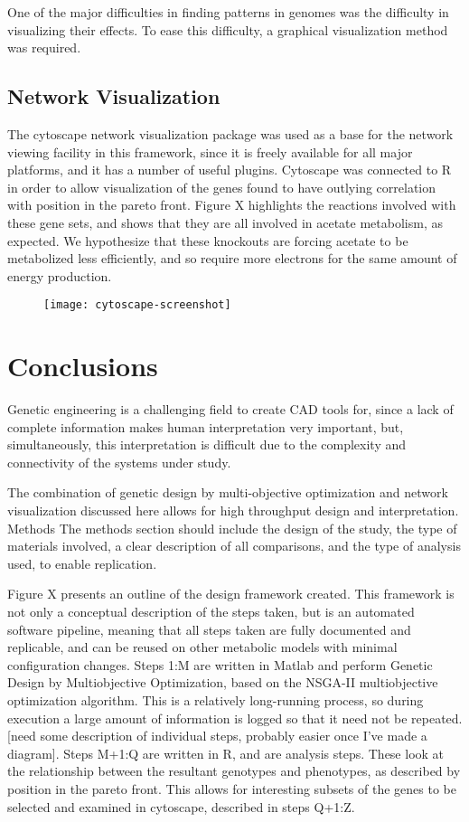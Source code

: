 \documentclass[a4paper]{article}
\begin{document}
One of the major difficulties in finding patterns in genomes was the difficulty in visualizing their effects. To ease this difficulty, a graphical visualization method was required.
\subsection{Network Visualization}
The cytoscape network visualization package was used as a base for the network viewing facility in this framework, since it is freely available for all major platforms, and it has a number of useful plugins. Cytoscape was connected to R in order to allow visualization of the genes found to have outlying correlation with position in the pareto front. Figure X highlights the reactions involved with these gene sets, and shows that they are all involved in acetate metabolism, as expected. We hypothesize that these knockouts are forcing acetate to be metabolized less efficiently, and so require more electrons for the same amount of energy production.
\begin{figure}
\texttt{[image: cytoscape-screenshot]}
\end{figure}

\section{Conclusions}

Genetic engineering is a challenging field to create CAD tools for, since a lack of complete information makes human interpretation very important, but, simultaneously, this interpretation is difficult due to the complexity and connectivity of the systems under study. 

The combination of genetic design by multi-objective optimization and network visualization discussed here allows for high throughput design and interpretation.
Methods
The methods section should include the design of the study, the type of materials involved, a clear description of all comparisons, and the type of analysis used, to enable replication.

Figure X presents an outline of the design framework created. This framework is not only a conceptual description of the steps taken, but is an automated software pipeline, meaning that all steps taken are fully documented and replicable, and can be reused on other metabolic models with minimal configuration changes. Steps 1:M are written in Matlab and perform Genetic Design by Multiobjective Optimization, based on the NSGA-II multiobjective optimization algorithm. This is a relatively long-running process, so during execution a large amount of information is logged so that it need not be repeated. [need some description of individual steps, probably easier once I’ve made a diagram]. Steps M+1:Q are written in R, and are analysis steps. These look at the relationship between the resultant genotypes and phenotypes, as described by position in the pareto front. This allows for interesting subsets of the genes to be selected and examined in cytoscape, described in steps Q+1:Z.
\end{document}
